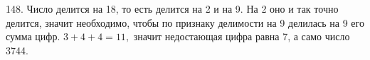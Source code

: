 148. Число делится на 18, то есть делится на 2 и на 9. На 2 оно и так точно делится, значит необходимо, чтобы по признаку делимости на 9 делилась на 9 его сумма цифр. $3+4+4=11,$ значит недостающая цифра равна 7, а само число 3744.\\
